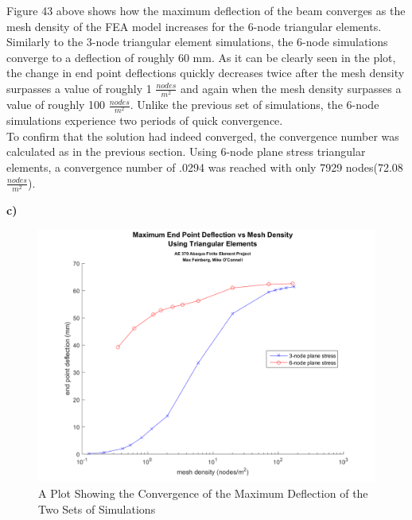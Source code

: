 \documentclass[a4paper]{article}
\begin{document}
Figure 43 above shows how the maximum deflection of the beam converges as the mesh density of the FEA model increases for the 6-node triangular elements. Similarly to the 3-node triangular element simulations, the 6-node simulations converge to a deflection of roughly 60 mm.  As it can be clearly seen in the plot, the change in end point deflections quickly decreases twice after the mesh density surpasses a value of roughly 1 $\frac{nodes}{m^{2}}$ and again when the mesh density surpasses a value of roughly 100 $\frac{nodes}{m^{2}}$.  Unlike the previous set of simulations, the 6-node simulations experience two periods of quick convergence.\\

To confirm that the solution had indeed converged, the convergence number was calculated as in the previous section.  Using 6-node plane stress triangular elements, a convergence number of .0294 was reached with only 7929 nodes(72.08 $\frac{nodes}{m^{2}}$).  

\clearpage

\textbf{c)}\\

\begin{figure}[ht]
\centering
\includegraphics[scale=.65]{ae370abaqus_combined.png}
\caption{A Plot Showing the Convergence of the Maximum Deflection of the Two Sets of Simulations}
\end{figure}
\end{document}
